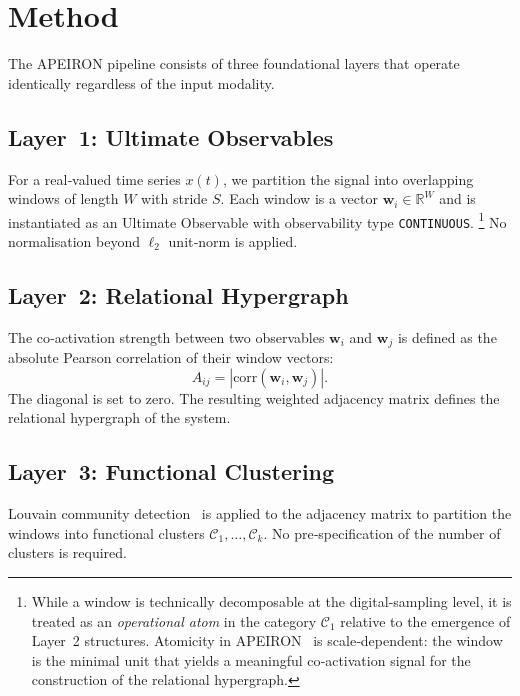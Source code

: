 \section{Method}\label{sec:method}
The APEIRON pipeline consists of three foundational layers that operate identically regardless of the input modality.

\subsection{Layer~1: Ultimate Observables}
For a real‑valued time series $x(t)$, we partition the signal into overlapping windows of length $W$ with stride $S$.
Each window is a vector $\mathbf{w}_i \in \mathbb{R}^W$ and is instantiated as an Ultimate Observable with observability type \texttt{CONTINUOUS}.
\footnote{While a window is technically decomposable at the digital‑sampling level, it is treated as an \emph{operational atom} in the category $\mathcal{C}_1$ relative to the emergence of Layer~2 structures. Atomicity in APEIRON~\cite{Beniers2026Categorical} is scale‑dependent: the window is the minimal unit that yields a meaningful co‑activation signal for the construction of the relational hypergraph.}
No normalisation beyond $\ell_2$ unit‑norm is applied.

\subsection{Layer~2: Relational Hypergraph}
The co‑activation strength between two observables $\mathbf{w}_i$ and $\mathbf{w}_j$ is defined as the absolute Pearson correlation of their window vectors:
\[
A_{ij} = \left|\mathrm{corr}(\mathbf{w}_i, \mathbf{w}_j)\right|.
\]
The diagonal is set to zero.
The resulting weighted adjacency matrix defines the relational hypergraph of the system.

\subsection{Layer~3: Functional Clustering}
Louvain community detection~\cite{Blondel2008} is applied to the adjacency matrix to partition the windows into functional clusters $\mathcal{C}_1, \dots, \mathcal{C}_k$.
No pre‑specification of the number of clusters is required.

